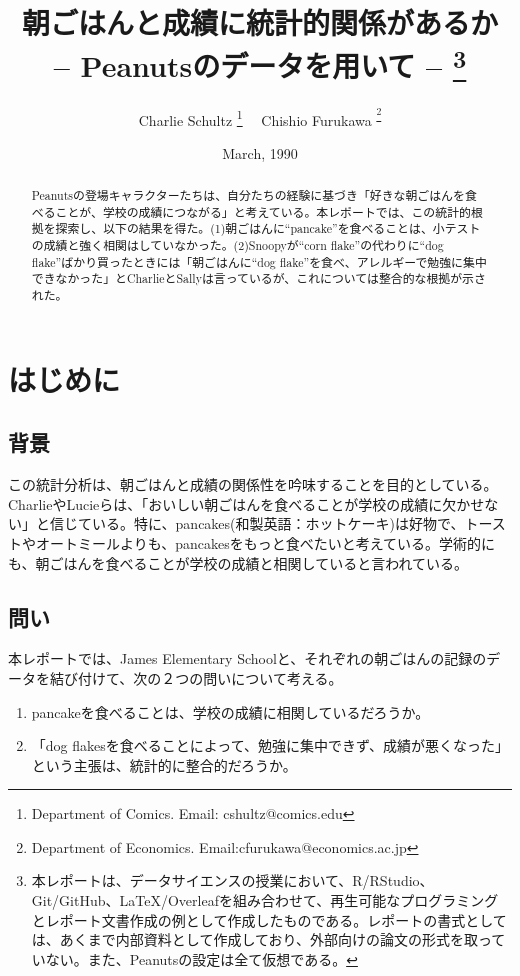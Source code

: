 \documentclass[xelatex,ja=standard]{bxjsarticle}
\title{朝ごはんと成績に統計的関係があるか \\ -- Peanutsのデータを用いて -- \thanks{本レポートは、データサイエンスの授業において、R/RStudio、Git/GitHub、LaTeX/Overleafを組み合わせて、再生可能なプログラミングとレポート文書作成の例として作成したものである。レポートの書式としては、あくまで内部資料として作成しており、外部向けの論文の形式を取っていない。また、Peanutsの設定は全て仮想である。}}
\author{Charlie Schultz
\thanks{Department of Comics. Email: cshultz@comics.edu}  \ \  Chishio Furukawa
\textsuperscript\thanks{Department of Economics. Email:cfurukawa@economics.ac.jp}}
\date{March, 1990}
\begin{document}
\renewcommand\footnotelayout{\small}
\sffamily\mdseries

\maketitle

\vspace{-10pt}\begin{abstract}
\begin{spacing}{1}
\noindent 
Peanutsの登場キャラクターたちは、自分たちの経験に基づき「好きな朝ごはんを食べることが、学校の成績につながる」と考えている。本レポートでは、この統計的根拠を探索し、以下の結果を得た。(1)朝ごはんに``pancake''を食べることは、小テストの成績と強く相関はしていなかった。(2)Snoopyが``corn flake''の代わりに``dog flake''ばかり買ったときには「朝ごはんに``dog flake''を食べ、アレルギーで勉強に集中できなかった」とCharlieとSallyは言っているが、これについては整合的な根拠が示された。\\

\end{spacing}
\end{abstract}

\newpage

\section{はじめに}

\subsection{背景} 

この統計分析は、朝ごはんと成績の関係性を吟味することを目的としている。CharlieやLucieらは、「おいしい朝ごはんを食べることが学校の成績に欠かせない」と信じている。特に、pancakes(和製英語：ホットケーキ)は好物で、トーストやオートミールよりも、pancakesをもっと食べたいと考えている。学術的にも、朝ごはんを食べることが学校の成績と相関していると言われている\citep{Furuse2020b}。

\subsection{問い}

本レポートでは、James Elementary Schoolと、それぞれの朝ごはんの記録のデータを結び付けて、次の２つの問いについて考える。

\begin{enumerate}
\item pancakeを食べることは、学校の成績に相関しているだろうか。
\item 「dog flakesを食べることによって、勉強に集中できず、成績が悪くなった」という主張は、統計的に整合的だろうか。
\end{enumerate}
\end{document}
